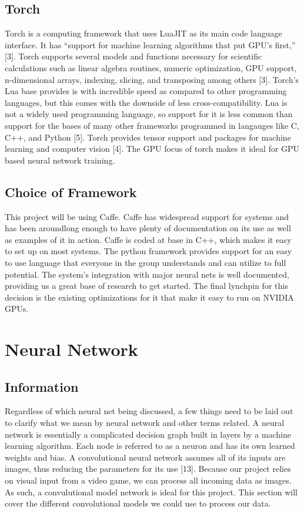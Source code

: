 \subsection{Torch}
Torch is a computing framework that uses LuaJIT as its main code language interface. 
It has “support for machine learning algorithms that put GPU’s first,” [3]. 
Torch supports several models and functions necessary for scientific calculations such as linear algebra routines, numeric optimization, GPU support, n-dimensional arrays, indexing, slicing, and transposing among others [3]. 
Torch’s Lua base provides is with incredible speed as compared to other programming languages, but this comes with the downside of less cross-compatibility. 
Lua is not a widely used programming language, so support for it is less common than support for the bases of many other frameworks programmed in langauges like C, C++, and Python [5]. 
Torch provides tensor support and packages for machine learning and computer vision [4]. 
The GPU focus of torch makes it ideal for GPU based neural network training.

\subsection{Choice of Framework}
This project will be using Caffe. 
Caffe has widespread support for systems and has been aroundlong enough to have plenty of documentation on its use as well as examples of it in action. 
Caffe is coded at base in C++, which makes it easy to set up on most systems. 
The python framework provides support for an easy to use language that everyone in the group understands and can utilize to full potential. 
The system's integration with major neural nets is well documented, providing us a great base of research to get started. 
The final lynchpin for this decision is the existing optimizations for it that make it easy to run on NVIDIA GPUs.

\section{Neural Network}

\subsection{Information}
Regardless of which neural net being discussed, a few things need to be laid out to clarify what we mean by neural network and other terms related. 
A neural network is essentially a complicated decision graph built in layers by a machine learning algorithm. 
Each node is referred to as a neuron and has its own learned weights and bias. 
A convolutional neural network assumes all of its inputs are images, thus reducing the parameters for its use [13]. 
Because our project relies on visual input from a video game, we can process all incoming data as images.
As such, a convulutional model network is ideal for this project.
This section will cover the different convolutional models we could use to process our data.

